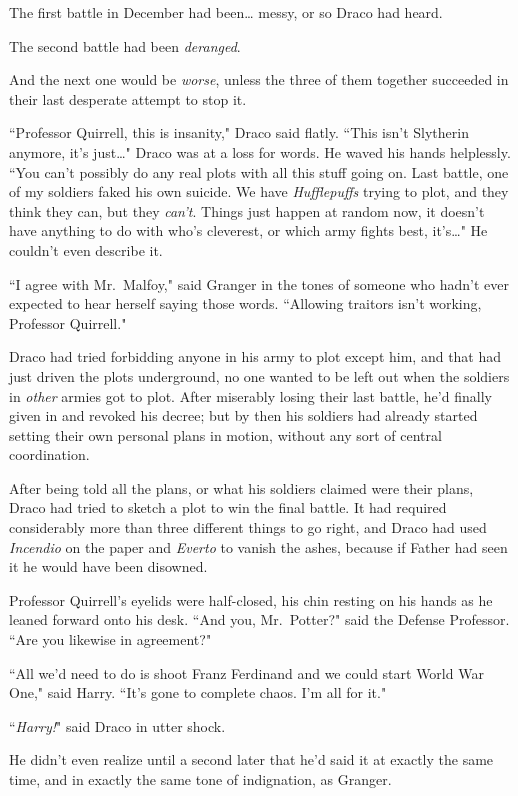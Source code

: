 The first battle in December had been{\ldots} messy, or so Draco had heard.

The second battle had been \emph{deranged}.

And the next one would be \emph{worse}, unless the three of them together succeeded in their last desperate attempt to stop it.

``Professor Quirrell, this is insanity," Draco said flatly. ``This isn't Slytherin anymore, it's just{\ldots}" Draco was at a loss for words. He waved his hands helplessly. ``You can't possibly do any real plots with all this stuff going on. Last battle, one of my soldiers faked his own suicide. We have \emph{Hufflepuffs} trying to plot, and they think they can, but they \emph{can't}. Things just happen at random now, it doesn't have anything to do with who's cleverest, or which army fights best, it's{\ldots}" He couldn't even describe it.

``I agree with Mr.~Malfoy," said Granger in the tones of someone who hadn't ever expected to hear herself saying those words. ``Allowing traitors isn't working, Professor Quirrell."

Draco had tried forbidding anyone in his army to plot except him, and that had just driven the plots underground, no one wanted to be left out when the soldiers in \emph{other} armies got to plot. After miserably losing their last battle, he'd finally given in and revoked his decree; but by then his soldiers had already started setting their own personal plans in motion, without any sort of central coordination.

After being told all the plans, or what his soldiers claimed were their plans, Draco had tried to sketch a plot to win the final battle. It had required considerably more than three different things to go right, and Draco had used \emph{Incendio} on the paper and \emph{Everto} to vanish the ashes, because if Father had seen it he would have been disowned.

Professor Quirrell's eyelids were half-closed, his chin resting on his hands as he leaned forward onto his desk. ``And you, Mr.~Potter?" said the Defense Professor. ``Are you likewise in agreement?"

``All we'd need to do is shoot Franz Ferdinand and we could start World War One," said Harry. ``It's gone to complete chaos. I'm all for it."

``\emph{Harry!}" said Draco in utter shock.

He didn't even realize until a second later that he'd said it at exactly the same time, and in exactly the same tone of indignation, as Granger.

